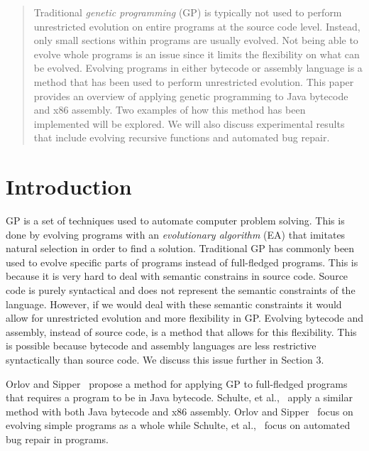 \documentclass{sig-alternate}
\begin{document}
\maketitle
\begin{abstract}
Traditional \textit{genetic programming} (GP) is typically not used to perform unrestricted evolution on entire programs at the source code level. Instead, only small sections within programs are usually evolved. Not being able to evolve whole programs is an issue since it limits the flexibility on what can be evolved. Evolving programs in either bytecode or assembly language is a method that has been used to perform unrestricted evolution. This paper provides an overview of applying genetic programming to Java bytecode and x86 assembly. Two examples of how this method has been implemented will be explored. We will also discuss experimental results that include evolving recursive functions and automated bug repair.
\end{abstract}



\section{Introduction}
GP is a set of techniques used to automate computer problem solving. This is done by evolving programs with an \textit{evolutionary algorithm} (EA) that imitates natural selection in order to find a solution. Traditional GP has commonly been used to evolve specific parts of programs instead of full-fledged programs. This is because it is very hard to deal with semantic constrains in source code. Source code is purely syntactical and does not represent the semantic constraints of the language. However, if we would deal with these semantic constraints it would allow for unrestricted evolution and more flexibility in GP. Evolving bytecode and assembly, instead of source code, is a method that allows for this flexibility. This is possible because bytecode and assembly languages are less restrictive syntactically than source code. We discuss this issue further in Section 3.\par 

Orlov and Sipper~\cite{FINCH2:2009} propose a method for applying GP to full-fledged programs that requires a program to be in Java bytecode. Schulte, et al.,~\cite{Assembly:2010} apply a similar method with both Java bytecode and x86 assembly. Orlov and Sipper~\cite{FINCH:2011} focus on evolving simple programs as a whole while Schulte, et al.,~\cite{Assembly:2010} focus on automated bug repair in programs.\par
	
\end{document}
